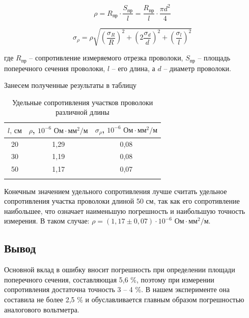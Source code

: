 \documentclass[a4paper, 12pt]{article}
\begin{document}
	\begin{minipage}{0.45\textwidth}
		\centering
		\begin{equation}
			\rho = R_\text{пр}\cdot\frac{S_\text{пр}}{l} = \frac{R_\text{пр}}{l} \cdot \frac{\pi d^2}{4}
		\end{equation}
	\end{minipage}
	\begin{minipage}{0.45\textwidth}
		\centering
		\begin{equation}
			\sigma_\rho = \rho\sqrt{\left(\frac{\sigma_R}{R}\right)^2 + \left( 2\frac{\sigma_d}{d} \right)^2 + \left( \frac{\sigma_l}{l}\right)^2}
		\end{equation}
		
	\end{minipage}
	
	\bigskip
	\noindent где $R_\text{пр}$ -- сопротивление измеряемого отрезка проволоки, $S_\text{пр}$ -- площадь поперечного сечения проволоки, $l$ -- его длина, а $d$ -- диаметр проволоки.
	
	Занесем полученные результаты в таблицу
	\begin{longtable}[H]{|c||c||c|}
		\hline
		$l \text{, см}$ & $\rho$, $ 10^{-6} \text{ Ом} \cdot \text{мм}^2 /\text{м}$ & $\sigma_\rho$, $ 10^{-6} \text{ Ом} \cdot \text{мм}^2 / \text{м}$\\
		\hline
		20 & 1,29 & 0,08\\
		\hline
		30 & 1,19 & 0,08\\
		\hline
		50 & 1,17 & 0,07\\
		\hline
		\caption{Удельные сопротивления участков проволоки различной длины}
	\end{longtable}

	Конечным значением удельного сопротивления лучше считать удельное сопротивления участка проволоки длиной 50 см, так как его сопротивление наибольшее, что означает наименьшую погрешность и наибольшую точность измерения. В таком случае: $\rho = \left( 1,17 \pm 0,07 \right) \cdot 10^{-6} \text{ Ом}\cdot \text{мм}^2/\text{м}$.
	
	\subsection{Вывод}
	
	Основной вклад в ошибку вносит погрешность при определении площади поперечного сечения, составляющая 5,6 \%, поэтому при измерении сопротивления достаточна точность 3 -- 4 \%. В нашем эксперименте она составила не более 2,5 \% и обуславливается главным образом погрешностью  аналогового вольтметра.
	
\end{document}
